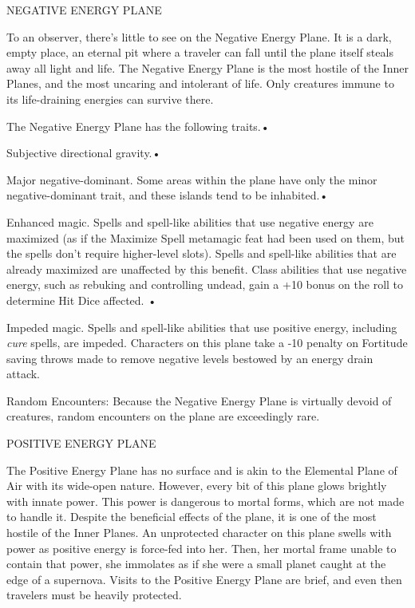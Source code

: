 \documentclass{article}
\begin{document}
\vspace{12pt}
\parindent=0pt
NEGATIVE ENERGY PLANE

To an observer, there's little to see on the Negative Energy Plane. It is a dark, 
empty place, an eternal pit where a traveler can fall until the plane itself steals 
away all light and life. The Negative Energy Plane is the most hostile of the Inner 
Planes, and the most uncaring and intolerant of life. Only creatures immune to 
its life-draining energies can survive there. 

The Negative Energy Plane has the following traits.• 

\parindent=3pt
Subjective directional gravity.• 

Major negative-dominant. Some areas within the plane have only the minor negative-dominant 
trait, and these islands tend to be inhabited.• 

\parindent=7pt
Enhanced magic. Spells and spell-like abilities that use negative energy are maximized 
(as if the Maximize Spell metamagic feat had been used on them, but the spells 
don't require higher-level slots). Spells and spell-like abilities that are already 
maximized are unaffected by this benefit. Class abilities that use negative energy, 
such as rebuking and controlling undead, gain a +10 bonus on the roll to determine 
Hit Dice affected. • 

\parindent=3pt
Impeded magic. Spells and spell-like abilities that use positive energy, including 
\textit{cure }spells, are impeded. Characters on this plane take a -10 penalty 
on Fortitude saving throws made to remove negative levels bestowed by an energy 
drain attack. 

\parindent=0pt
Random Encounters: Because the Negative Energy Plane is virtually devoid of creatures, 
random encounters on the plane are exceedingly rare.

\vspace{12pt}
POSITIVE ENERGY PLANE

The Positive Energy Plane has no surface and is akin to the Elemental Plane of 
Air with its wide-open nature. However, every bit of this plane glows brightly 
with innate power. This power is dangerous to mortal forms, which are not made 
to handle it. Despite the beneficial effects of the plane, it is one of the most 
hostile of the Inner Planes. An unprotected character on this plane swells with 
power as positive energy is force-fed into her. Then, her mortal frame unable to 
contain that power, she immolates as if she were a small planet caught at the edge 
of a supernova. Visits to the Positive Energy Plane are brief, and even then travelers 
must be heavily protected.
\end{document}

